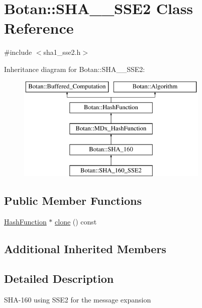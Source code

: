 \hypertarget{classBotan_1_1SHA__160__SSE2}{\section{Botan\-:\-:S\-H\-A\-\_\-\_\-\-S\-S\-E2 Class Reference}
\label{classBotan_1_1SHA__160__SSE2}
}


{\ttfamily \#include $<$sha1\-\_\-sse2.\-h$>$}

Inheritance diagram for Botan\-:\-:S\-H\-A\-\_\-\_\-\-S\-S\-E2\-:\begin{figure}[H]
\begin{center}
\leavevmode
\includegraphics[height=5.000000cm]{classBotan_1_1SHA__160__SSE2}
\end{center}
\end{figure}
\subsection*{Public Member Functions}
\begin{DoxyCompactItemize}
\item 
\hyperlink{classBotan_1_1HashFunction}{Hash\-Function} $\ast$ \hyperlink{classBotan_1_1SHA__160__SSE2_aeadcb7e662c26203cc4ec79062fe0e59}{clone} () const 
\end{DoxyCompactItemize}
\subsection*{Additional Inherited Members}


\subsection{Detailed Description}
S\-H\-A-\/160 using S\-S\-E2 for the message expansion 

